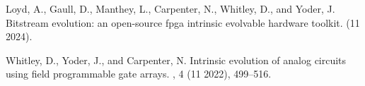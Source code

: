 \documentclass{article}
\begin{document}
\begin{thebibliography}{1}
\begin{minipage}{0.97\textwidth}
{\sc Loyd, A., Gaull, D., Manthey, L., Carpenter, N., Whitley, D., and Yoder,
  J.}
\newblock Bitstream evolution: an open-source fpga intrinsic evolvable hardware
  toolkit.
 (11 2024).

{\sc Whitley, D., Yoder, J., and Carpenter, N.}
\newblock Intrinsic evolution of analog circuits using field programmable gate
  arrays.
, 4 (11 2022), 499--516.
\end{minipage}
\end{thebibliography}
%
%
\end{document}
